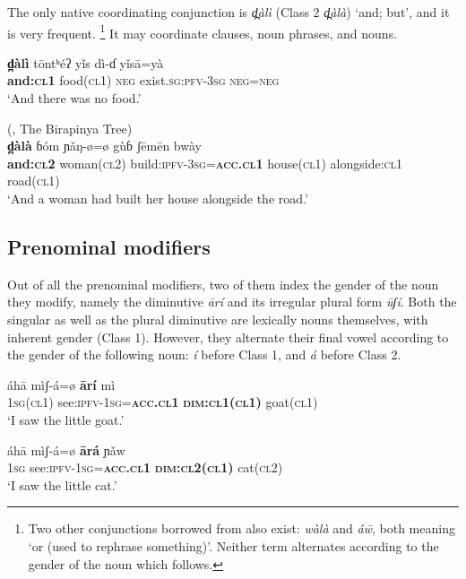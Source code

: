 \documentclass[output=collectionpaper,hidelinks]{langscibook}
\theoremstyle{remark}
\begin{document}
The only native coordinating conjunction is \emph{d̪àlì} (Class 2
\emph{d̪àlà}) `and; but', and it is very frequent.%
\footnote{Two other conjunctions borrowed from  also exist: \emph{wàlà}
and \emph{áw̄}, both meaning `or (used to rephrase something)'.  Neither term
alternates according to the gender of the noun which follows.} %
It may coordinate clauses, noun phrases, and nouns.

\ea
\gll  \textbf{d̪àlì} tōntʰéʔ yǐs\aMidLow{} dì-ɗ yǐsā=yà \\
 \textbf{and:\textsc{cl1}} food(\textsc{cl1}) \textsc{neg} exist.\textsc{sg}:\textsc{pfv}-\textsc{3sg} \textsc{neg}=\textsc{neg} \\
\glt `And there was no food.' \\
\z

\ea
(\citealt{James1979}, The Birapinya Tree)\\
\gll  \textbf{d̪àlà} ɓóm ɲǎŋ-ø=ø gùɓ ʃēmēn bwày \\
 \textbf{and:\textsc{cl2}} woman(\textsc{cl2}) build:\textsc{ipfv}-\textsc{3sg}=\textbf{\textsc{acc.cl1}} house(\textsc{cl1}) alongside:\textsc{cl1} road(\textsc{cl1}) \\
\glt `And a woman had built her house alongside the road.' \\
\z


\subsection{Prenominal modifiers}
\label{sec:Don:Prenominal_modifiers}

Out of all the prenominal modifiers, two of them index the gender of the noun
they modify, namely the diminutive \emph{ārí} and its irregular plural form
\emph{ūʃí}.  Both the singular as well as the plural diminutive are lexically
nouns themselves, with inherent gender (Class 1).  However, they alternate their
final vowel according to the gender of the following noun: \emph{í} before Class
1, and \emph{á} before Class 2.

\ea
\gll  áhā mìʃ-á=ø \textbf{ārí} mì \\
 \textsc{1sg}(\textsc{cl1}) see:\textsc{ipfv}-\textsc{1sg}=\textbf{\textsc{acc.cl1}} \textbf{\textsc{dim:cl1}(\textsc{cl1})} goat(\textsc{cl1}) \\
\glt `I saw the little goat.' \\
\z

\ea
\gll  áhā mìʃ-á=ø \textbf{ārá} ɲǎw \\
 \textsc{1sg} see:\textsc{ipfv}-\textsc{1sg}=\textbf{\textsc{acc.cl1}} \textbf{\textsc{dim:cl2}(\textsc{cl1})} cat(\textsc{cl2}) \\
\glt `I saw the little cat.' \\
\z
\end{document}
